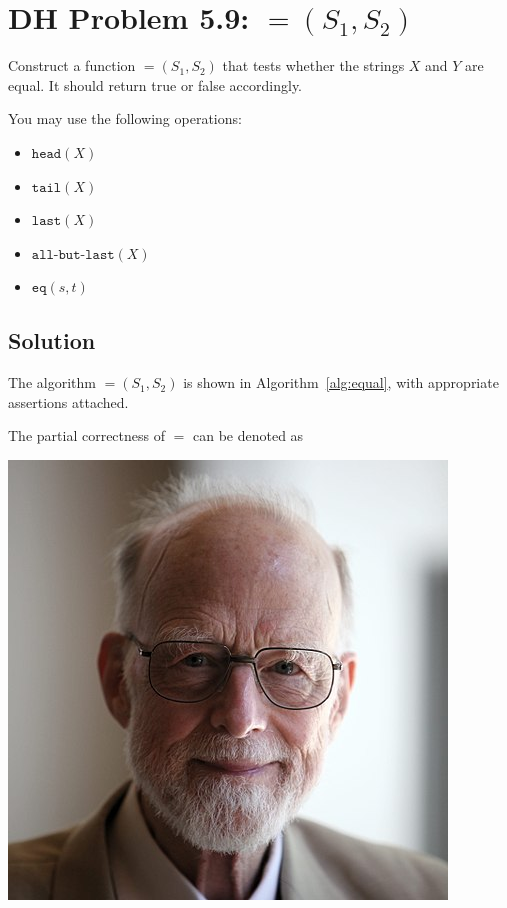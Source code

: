 
\section{DH Problem 5.9: $\equal(S_1, S_2)$~\cite{DH}}  \label{section:problem-5.9}
  Construct a function $\equal(S_1, S_2)$ that tests whether the strings $X$ and $Y$ are equal.
  It should return true or false accordingly.

  You may use the following operations:
  \begin{itemize}
    \item $\texttt{head}(X)$
    \item $\texttt{tail}(X)$
    \item $\texttt{last}(X)$
    \item $\texttt{all-but-last}(X)$
    \item $\texttt{eq}(s,t)$
  \end{itemize}
\subsection{Solution}

The algorithm $\equal(S_1, S_2)$ is shown in Algorithm~\ref{alg:equal},
with appropriate assertions attached.

The partial correctness of $\equal$ can be denoted as

\begin{marginfigure}%
  \includegraphics[width=0.60\linewidth]{figs/tony-hoare}
  \label{fig:hoare}
\end{marginfigure}


